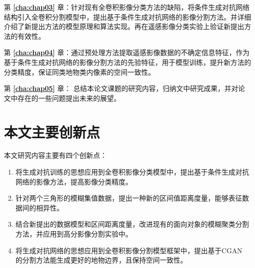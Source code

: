 第 \textbf{\ref{cha:chap03}} 章：针对现有全卷积影像分类方法的缺陷，将条件生成对抗网络结构引入全卷积分割模型中，提出基于条件生成对抗网络的影像分割方法。并详细介绍了新提出方法的模型原理和算法实现。再在遥感影像分类实验上验证新提出方法的有效性。

第 \textbf{\ref{cha:chap04}} 章：通过预处理方法提取遥感影像数据的不确定信息特征，作为基于条件生成对抗网络的影像分割方法的先验特征，用于模型训练，提升新方法的分类精度，保证同类地物类内像素的空间一致性。

第 \textbf{\ref{cha:chap05}} 章： 总结本论文课题的研究内容，归纳文中研究成果，并对论文中存在的一些问题提出未来的展望。


\section{本文主要创新点}
\label{sec:forth}
本文研究内容主要有四个创新点：
\begin{enumerate}[(1)]
    \item 将生成对抗训练的思想应用到全卷积影像分类模型中，提出基于条件生成对抗网络的影像方法，提高影像分类精度。
    \item 针对两个三角形的模糊集值数据，提出一种新的区间值距离度量，能够表征数据间的相异性。
    \item 结合新提出的数据模型和区间距离度量，改进现有的面向对象的模糊聚类分割方法，并应用到高分影像分割实验中。
    \item 将生成对抗网络的思想应用到全卷积影像分割模型框架中，提出基于CGAN 的分割方法能生成更好的地物边界，且保持空间一致性。

\end{enumerate}
